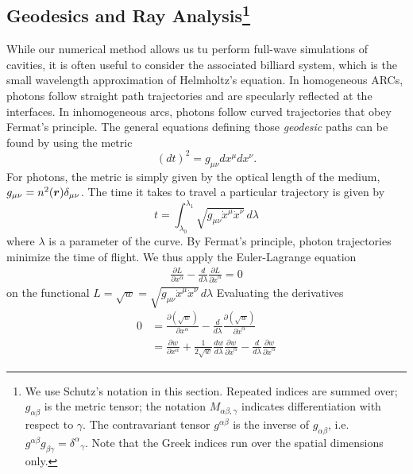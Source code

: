 \subsection[Geodesics and Ray Analysis]{Geodesics and Ray Analysis\footnote{We use Schutz's \cite{SCH2009} notation in this section.
Repeated indices are summed over; $g_{\alpha\beta}$ is the metric tensor; the notation 
$M_{\alpha\beta,\gamma}$ indicates differentiation with respect to $\gamma$. The contravariant
tensor $g^{\alpha\beta}$ is the inverse of $g_{\alpha\beta}$, i.e. $g^{\alpha\beta}g_{\beta\gamma}={\delta^\alpha}_\gamma$. Note that the Greek indices run over the spatial dimensions only.}}
While our numerical method allows us tu perform full-wave
simulations of cavities, it is often useful to consider the associated
billiard system, which is the small wavelength approximation of 
Helmholtz's equation. In homogeneous ARCs, photons follow straight path
trajectories and are specularly reflected at the interfaces. In inhomogeneous
\glspl{arc}, photons follow curved trajectories that obey Fermat's principle. 
The general equations defining those \textit{geodesic} paths can be found
by using the metric
  \begin{equation}
   (dt)^2=g_{\mu\nu}dx^\mu dx^\nu. 
  \end{equation}
For photons, the metric is simply given by the optical length 
of the medium, $g_{\mu\nu}=n^2(\boldsymbol{r})\delta_{\mu\nu}$. 
The time it takes to travel a particular trajectory is given by
  \begin{equation}
   t = \int_{\lambda_0}^{\lambda_1} \sqrt{g_{\mu\nu}\dot{x}^\mu\dot{x}^\nu}\,d\lambda
  \end{equation}
where $\lambda$ is a parameter of the curve. By Fermat's principle, photon 
trajectories minimize the time of flight. We thus apply the Euler-Lagrange
equation 
  \begin{align}
   \frac{\partial L}{\partial x^\alpha}-\frac{d}{d\lambda}\frac{\partial L}{\partial\dot{x}^\alpha}=0
  \end{align}
on the functional $L=\sqrt{w}=\sqrt{g_{\mu\nu}\dot{x}^\mu\dot{x}^\nu}\,d\lambda$ Evaluating the derivatives
  \begin{align*}
  0	&=\frac{\partial\left(\sqrt{w}\right)}{\partial x^\alpha}-\frac{d}{d\lambda}\frac{\partial\left(\sqrt{w}\right)}{\partial\dot{x}^\alpha}	\\
  {}	&=\frac{\partial w}{\partial x^\alpha}+\frac{1}{2\sqrt{w}}\frac{dw}{d\lambda}\frac{\partial w}{\partial\dot{x}^\alpha}-\frac{d}{d\lambda}\frac{\partial w}{\partial\dot{x}^\alpha}
  \end{align*}
